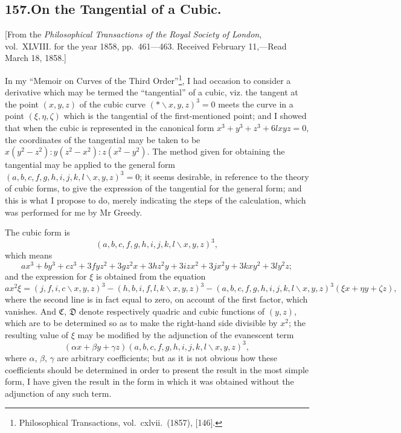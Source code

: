 \documentclass[11pt,a4paper]{book}
\begin{document}
\begin{center}
\vspace{2em}
\noindent\hrulefill


\section*{157.\quad On the Tangential of a Cubic.}

\begin{flushleft}
\small
[From the \textit{Philosophical Transactions of the Royal Society of London}, vol.~XLVIII.
for the year 1858, pp.~461---463. Received February 11,---Read March 18, 1858.]
\end{flushleft}

In my ``Memoir on Curves of the Third Order''\footnote{Philosophical Transactions, vol.~cxlvii.~(1857), [146].}, I had occasion to consider a
derivative which may be termed the ``tangential'' of a cubic, viz. the tangent at
the point $(x, y, z)$ of the cubic curve $(\ast\!\backslash x, y, z)^3 = 0$ meets the curve in a point
$(\xi, \eta, \zeta)$ which is the tangential of the first-mentioned point; and I showed that when
the cubic is represented in the canonical form $x^3+y^3+z^3+6lxyz=0$, the coordinates of
the tangential may be taken to be $x(y^2-z^2) : y(z^2-x^2) : z(x^2-y^2)$. The method given for
obtaining the tangential may be applied to the general form $(a,b,c,f,g,h,i,j,k,l\!\backslash x,y,z)^3=0$;
it seems desirable, in reference to the theory of cubic forms, to give the expression of
the tangential for the general form; and this is what I propose to do, merely indicating
the steps of the calculation, which was performed for me by Mr Greedy.

The cubic form is
\[
(a,b,c,f,g,h,i,j,k,l\!\backslash x,y,z)^3,
\]
which means
\[
ax^3+by^3+cz^3+3fyz^2+3gz^2x+3hz^2y+3izx^2+3jx^2y+3kxy^2+3ly^2z;
\]
and the expression for $\xi$ is obtained from the equation
\[
a x^2 \xi = (j,f,i,c\!\backslash x,y,z)^3 - (h,b,i,f,l,k\!\backslash x,y,z)^3 -(a,b,c,f,g,h,i,j,k,l\!\backslash x,y,z)^3 (\xi x+\eta y+\zeta z),
\]
where the second line is in fact equal to zero, on account of the first factor, which
vanishes. And $\mathfrak{C}$, $\mathfrak{D}$ denote respectively quadric and cubic functions of $(y, z)$, which
are to be determined so as to make the right-hand side divisible by $x^2$; the resulting
value of $\xi$ may be modified by the adjunction of the evanescent term
\[
(\alpha x+\beta y+\gamma z)(a,b,c,f,g,h,i,j,k,l\!\backslash x,y,z)^3,
\]
where $\alpha$, $\beta$, $\gamma$ are arbitrary coefficients; but as it is not obvious how these coefficients
should be determined in order to present the result in the most simple form, I have
given the result in the form in which it was obtained without the adjunction of any
such term.


\end{center}
\end{document}
